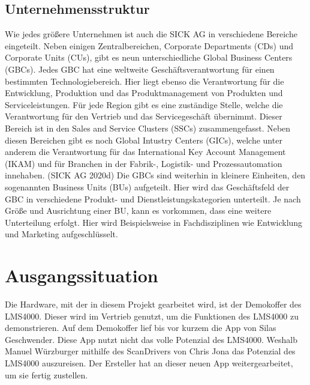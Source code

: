 \subsection{Unternehmensstruktur}
Wie jedes größere Unternehmen ist auch die SICK AG in verschiedene Bereiche eingeteilt. 
Neben einigen Zentralbereichen, Corporate Departments (CDs) und Corporate Units (CUs), 
gibt es neun unterschiedliche Global Business Centers (GBCs). Jedes GBC hat eine weltweite 
Geschäftsverantwortung für einen bestimmten Technologiebereich. Hier liegt ebenso die 
Verantwortung für die Entwicklung, Produktion und das Produktmanagement von Produkten 
und Serviceleistungen.
Für jede Region gibt es eine zuständige Stelle, welche die Verantwortung für den Vertrieb und 
das Servicegeschäft übernimmt. Dieser Bereich ist in den Sales and Service Clusters (SSCs)
zusammengefasst.
Neben diesen Bereichen gibt es noch Global Intustry Centers (GICs), welche unter anderem 
die Verantwortung für das International Key Account Management (IKAM) und für Branchen 
in der Fabrik-, Logistik- und Prozessautomation innehaben. (SICK AG 2020d)
Die GBCs sind weiterhin in kleinere Einheiten, den sogenannten Business Units (BUs) 
aufgeteilt. Hier wird das Geschäftsfeld der GBC in verschiedene Produkt- und 
Dienstleistungskategorien unterteilt.
Je nach Größe und Ausrichtung einer BU, kann es vorkommen, dass eine weitere Unterteilung 
erfolgt. Hier wird Beispielsweise in Fachdisziplinen wie Entwicklung und Marketing 
aufgeschlüsselt.


\section{Ausgangssituation}

Die Hardware, mit der in diesem Projekt gearbeitet wird, ist der Demokoffer des LMS4000. Dieser wird im Vertrieb genutzt, um die Funktionen des LMS4000 zu demonstrieren. Auf dem Demokoffer lief bis vor kurzem die App von Silas Geschwender. Diese App nutzt nicht das volle Potenzial des LMS4000. Weshalb Manuel Würzburger mithilfe des ScanDrivers von Chris Jona das Potenzial des LMS4000 auszureisen. Der Ersteller hat an dieser neuen App weitergearbeitet, um sie fertig zustellen.

